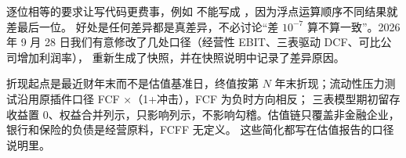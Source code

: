逐位相等的要求让写代码更费事，例如  不能写成 ，因为浮点运算顺序不同结果就差最后一位。
好处是任何差异都是真差异，不必讨论“差 $10^{-7}$ 算不算一致”。2026 年 9 月 28 日我们有意修改了几处口径（经营性 EBIT、三表驱动 DCF、可比公司增加利润率），
重新生成了快照，并在快照说明中记录了差异原因。

\begin{note}[已知的口径简化]
折现起点是最近财年末而不是估值基准日，终值按第 $N$ 年末折现；流动性压力测试沿用原插件口径 FCF ×（1+冲击），FCF 为负时方向相反；
三表模型期初留存收益置 0、权益合并列示，只影响列示，不影响勾稽。估值链只覆盖非金融企业，银行和保险的负债是经营原料，FCFF 无定义。
这些简化都写在估值报告的口径说明里。
\end{note}
